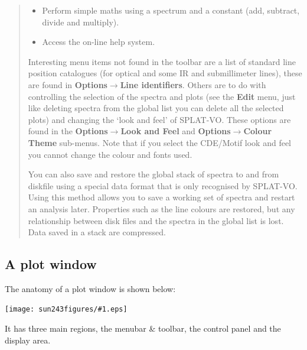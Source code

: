 \documentclass[twoside,11pt]{article}
\newcommand{\htmladdimg}[1]{}
\newcommand{\latexhtml}[2]{#1}
\newcommand{\xlabel}[1]{}
\renewcommand{\_}{\texttt{\symbol{95}}}
\newcommand{\SPLAT}{\textsf{SPLAT-VO}}
\newcommand{\mainfigure}[1]
{\begin{center}
 \latexhtml{\texttt{[image: sun243\_figures/\#1.eps]}}{\htmladdimg{#1.gif}}
 \end{center}
}
\newcommand{\inline}[1]
        {\latexhtml{\texttt{[image: sun243\_figures/\#1.eps]}}
        {\htmladdimg[align=center]{#1.gif}}}
\newcommand{\menuitem}[1]{\textbf{#1}}
\newcommand{\submenuitem}[2]{\latexhtml{\textbf{#1$\rightarrow$#2}}{\textbf{#1->#2}}}
\begin{document}
\begin{quote}
\begin{itemize}
  \item[\inline{unarymaths}] Perform simple maths using a spectrum and a
  constant (add, subtract, divide and multiply).

  \item[\inline{help}] Access the on-line help system.

\end{itemize}

 Interesting menu items not found in the toolbar are a list of standard line
 position catalogues (for optical and some IR and submillimeter lines), these
 are found in \submenuitem{Options}{Line identifiers}.  Others are to do with
 controlling the selection of the spectra and plots (see the \menuitem{Edit}
 menu, just like deleting spectra from the global list you can delete all the
 selected plots) and changing the `look and feel' of \SPLAT. These options are
 found in the \submenuitem{Options}{Look and Feel} and
 \submenuitem{Options}{Colour Theme} sub-menus. Note that if you select the
 CDE/Motif look and feel you cannot change the colour and fonts used.

 You can also save and restore the global stack of spectra to and from
 diskfile using a special data format that is only recognised by \SPLAT.
 Using this method allows you to save a working set of spectra and restart an
 analysis later. Properties such as the line colours are restored, but any
 relationship between disk files and the spectra in the global list is
 lost. Data saved in a stack are compressed.

\end{quote}

\newpage
\subsection{A plot window\xlabel{plot_window}}

The anatomy of a plot window is shown below:

\mainfigure{plot3}

It has three main regions, the menubar \& toolbar, the control panel and
the display area.\\
\end{document}
